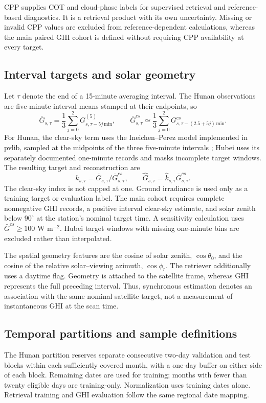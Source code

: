 \documentclass[11pt]{article}
\begin{document}
CPP supplies COT and cloud-phase labels for supervised retrieval and reference-based diagnostics. It is a retrieval product with its own uncertainty. Missing or invalid CPP values are excluded from reference-dependent calculations, whereas the main paired GHI cohort is defined without requiring CPP availability at every target.

\subsection{Interval targets and solar geometry}
Let $\tau$ denote the end of a 15-minute averaging interval. The Hunan observations are five-minute interval means stamped at their endpoints, so
\begin{equation}
\bar G_{s,\tau}=\frac{1}{3}\sum_{j=0}^{2}G^{(5)}_{s,\tau-5j\,\mathrm{min}},
\qquad
\bar G^{cs}_{s,\tau}\simeq
\frac{1}{3}\sum_{j=0}^{2}G^{cs}_{s,\tau-(2.5+5j)\,\mathrm{min}} .
\label{eq:interval}
\end{equation}
For Hunan, the clear-sky term uses the Ineichen--Perez model implemented in pvlib, sampled at the midpoints of the three five-minute intervals \cite{ineichen,pvlibclear}; Hubei uses its separately documented one-minute records and masks incomplete target windows. The resulting target and reconstruction are
\begin{equation}
k_{s,\tau}=\bar G_{s,\tau}/\bar G^{cs}_{s,\tau},
\qquad
\widehat G_{s,\tau}=\widehat k_{s,\tau}\bar G^{cs}_{s,\tau}.
\label{eq:kt}
\end{equation}
The clear-sky index is not capped at one. Ground irradiance is used only as a training target or evaluation label. The main cohort requires complete nonnegative GHI records, a positive interval clear-sky estimate, and solar zenith below $90^\circ$ at the station's nominal target time. A sensitivity calculation uses $\bar G^{cs}\geq100$ W m$^{-2}$. Hubei target windows with missing one-minute bins are excluded rather than interpolated.

The spatial geometry features are the cosine of solar zenith, $\cos\theta_0$, and the cosine of the relative solar--viewing azimuth, $\cos\phi_r$. The retriever additionally uses a daytime flag. Geometry is attached to the satellite frame, whereas GHI represents the full preceding interval. Thus, synchronous estimation denotes an association with the same nominal satellite target, not a measurement of instantaneous GHI at the scan time.

\subsection{Temporal partitions and sample definitions}
The Hunan partition reserves separate consecutive two-day validation and test blocks within each sufficiently covered month, with a one-day buffer on either side of each block. Remaining dates are used for training; months with fewer than twenty eligible days are training-only. Normalization uses training dates alone. Retrieval training and GHI evaluation follow the same regional date mapping.
\end{document}
